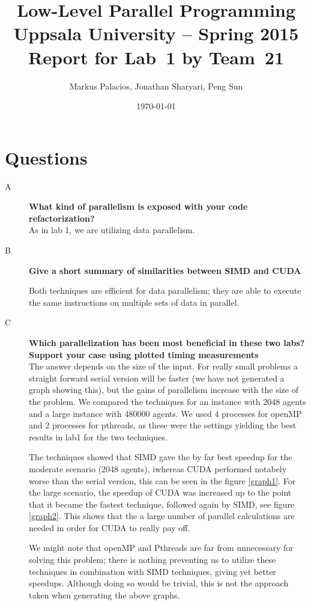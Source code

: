 \documentclass[a4paper,11pt]{article}
\title{\textbf{Low-Level Parallel Programming \\
    Uppsala University -- Spring 2015 \\
    Report for Lab~1
    by Team~21  %
  }
}
\author{Markus Palacios, Jonathan Sharyari, Peng Sun} %
\date{\today}
\begin{document}
\maketitle

\section{Questions}
\begin{description}
    \item[A] \textbf{What kind of parallelism is exposed with your code refactorization?}
 \hfill \\ 
As in lab 1, we are utilizing data parallelism.
    \item[B] \textbf{Give a short summary of similarities between SIMD and CUDA} \hfill

Both techniques are efficient for data parallelism; they are able to execute the same instructions on multiple sets of data in parallel.
    
    \item[C] \textbf{Which parallelization has been most beneficial in these two labs? Support your case using plotted timing measurements} \hfill \\
The answer depends on the size of the input. For really small problems a straight forward serial version will be faster (we have not generated a graph showing this), but the gains of parallelism increase with the size of the problem. We compared the techniques for an instance with 2048 agents and a large instance with 480000 agents. We used 4 processes for openMP and 2 processes for pthreads, as these were the settings yielding the best results in lab1 for the two techniques.

The techniques showed that SIMD gave the by far best speedup for the moderate scenario (2048 agents), iwhereas CUDA performed notabely worse than the serial version, this can be seen in the figure \ref{graph1}. For the large scenario, the speedup of CUDA was increased up to the point that it became the fastest technique, followed again by SIMD, see figure \ref{graph2}. This shows that the a large number of parallel calculations are needed in order for CUDA to really pay off.

We might note that openMP and Pthreads are far from unnecessary for solving this problem; there is nothing preventing us to utilize these techniques in combination with SIMD techniques, giving yet better speedups. Although doing so would be trivial, this is not the approach taken when generating the above graphs.


\end{description}
\end{document}
